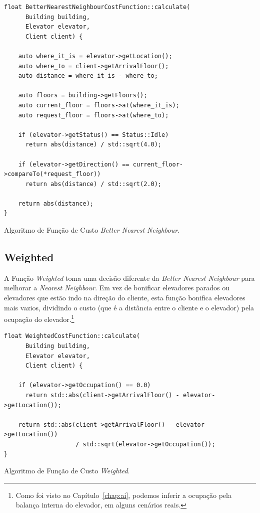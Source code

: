 \begin{algorithm}[htb!]
  \centering
  \begin{verbatim}
float BetterNearestNeighbourCostFunction::calculate(
      Building building,
      Elevator elevator,
      Client client) {

    auto where_it_is = elevator->getLocation();
    auto where_to = client->getArrivalFloor();
    auto distance = where_it_is - where_to;

    auto floors = building->getFloors();
    auto current_floor = floors->at(where_it_is);
    auto request_floor = floors->at(where_to);

    if (elevator->getStatus() == Status::Idle)
      return abs(distance) / std::sqrt(4.0);

    if (elevator->getDirection() == current_floor->compareTo(*request_floor))
      return abs(distance) / std::sqrt(2.0);

    return abs(distance);
}
  \end{verbatim}
  \caption{\label{alg:bnn_cf}Algoritmo de Função de Custo \textit{Better Nearest Neighbour}.}
\end{algorithm}

\subsection{\label{model:costfunctions:weighted}Weighted}
A Função \textit{Weighted} toma uma decisão diferente da \textit{Better Nearest
  Neighbour} para melhorar a \textit{Nearest Neighbour}. Em vez de bonificar
elevadores parados ou elevadores que estão indo na direção do cliente, esta
função bonifica elevadores mais vazios, dividindo o custo (que é a distância
entre o cliente e o elevador) pela ocupação do elevador.\footnote{Como foi visto
no Capítulo~\ref{chap:ai}, podemos inferir a ocupação pela balança interna do elevador, em
alguns cenários reais.}

\begin{algorithm}[htb!]
  \centering
  \begin{verbatim}
float WeightedCostFunction::calculate(
      Building building,
      Elevator elevator,
      Client client) {

    if (elevator->getOccupation() == 0.0)
      return std::abs(client->getArrivalFloor() - elevator->getLocation());

    return std::abs(client->getArrivalFloor() - elevator->getLocation())
                    / std::sqrt(elevator->getOccupation());
}
  \end{verbatim}
  \caption{\label{alg:weighted_cf}Algoritmo de Função de Custo \textit{Weighted}.}
\end{algorithm}

